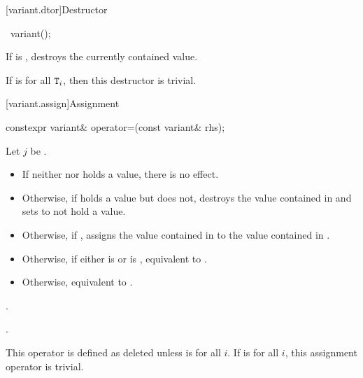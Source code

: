 [variant.dtor]{Destructor}

%
\begin{itemdecl}
~variant();
\end{itemdecl}

\begin{itemdescr}
\pnum
\effects
If  is ,
destroys the currently contained value.

\pnum
\remarks
If  is  for all $\texttt{T}_i$,
then this destructor is trivial.
\end{itemdescr}

[variant.assign]{Assignment}

%
\begin{itemdecl}
constexpr variant& operator=(const variant& rhs);
\end{itemdecl}

\begin{itemdescr}
\pnum
Let $j$ be .

\pnum
\effects
\begin{itemize}
\item
If neither  nor  holds a value, there is no effect.
\item
Otherwise, if  holds a value but  does not, destroys the value
contained in  and sets  to not hold a value.
\item
Otherwise, if , assigns the value contained in 
to the value contained in .
\item
Otherwise, if either 
is  or
 is ,
equivalent to .
\item
Otherwise, equivalent to .
\end{itemize}

\pnum
\ensures
{}.

\pnum
\returns
{}.

\pnum
\remarks
This operator is defined as deleted unless
is  for all $i$.
If 
is  for all $i$, this assignment operator is trivial.
\end{itemdescr}

